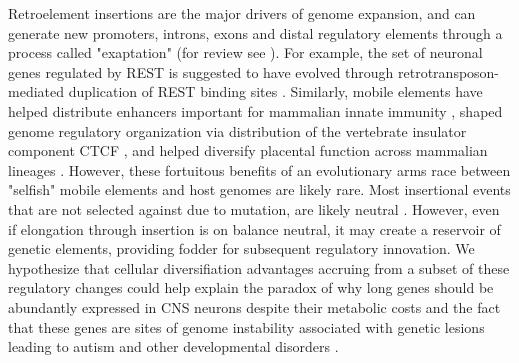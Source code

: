Retroelement insertions are the major drivers of genome expansion, and can generate new promoters, introns, exons and distal regulatory elements through a process called "exaptation" (for review see \citealt{Chuong_2016}). For example, the set of neuronal genes regulated by REST is suggested to have evolved through retrotransposon-mediated duplication of REST binding sites \citep{Johnson_2006}. Similarly, mobile elements have helped distribute enhancers important for mammalian innate immunity \cite{Chuong_2016a}, shaped genome regulatory organization via distribution of the vertebrate insulator component CTCF \citep{Schmidt_2012}, and helped diversify placental function across mammalian lineages \citep{Chuong_2013}. However, these fortuitous benefits of an evolutionary arms race between "selfish" mobile elements and host genomes are likely rare. Most insertional events that are not selected against due to mutation, are likely neutral \cite{Zhang_2011}. However, even if elongation through insertion is on balance neutral, it may create a reservoir of genetic elements, providing fodder for subsequent regulatory innovation. We hypothesize that cellular diversifiation advantages accruing from a subset of these regulatory changes could help explain the paradox of why long genes should be abundantly expressed in CNS neurons despite their metabolic costs and the fact that these genes are sites of genome instability associated with genetic lesions leading to autism and other developmental disorders \citep{Wei_2016}. 




